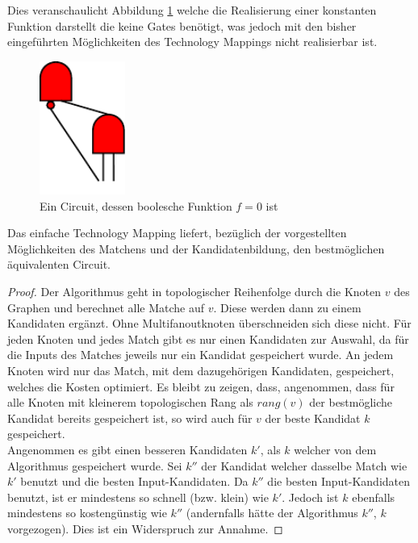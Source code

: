 \documentclass[11pt, a4paper, german]{article}
\newcommand{\TM}{Technology  Mapping }
\begin{document}
Dies veranschaulicht Abbildung \ref{bild:compl_redundant} welche die Realisierung einer konstanten Funktion darstellt die keine Gates benötigt, was jedoch mit den bisher eingeführten  Möglichkeiten des Technology Mappings nicht realisierbar ist.
\begin{figure}
		\includegraphics[width = 2.8cm]{pictures/compiled/compl_redundant}
		\caption{Ein Circuit, dessen boolesche Funktion $f = 0 $ ist}
		\label{bild:compl_redundant}
\end{figure}
\begin{cor}
	Das einfache \TM  liefert, bezüglich der vorgestellten Möglichkeiten des Matchens und der Kandidatenbildung, den bestmöglichen äquivalenten Circuit.
\end{cor}
\begin{proof} 
	Der Algorithmus geht in topologischer Reihenfolge durch die Knoten $v$ des Graphen und berechnet alle Matche auf $v$. Diese werden dann zu einem Kandidaten ergänzt. 
 Ohne Multifanoutknoten überschneiden sich diese nicht. Für jeden Knoten und jedes Match gibt es nur einen Kandidaten zur Auswahl, da für die Inputs des Matches jeweils nur ein Kandidat gespeichert wurde. An jedem Knoten wird nur das Match, mit dem dazugehörigen Kandidaten, gespeichert, welches die Kosten optimiert. 
 Es bleibt zu zeigen, dass, angenommen, dass für alle Knoten mit kleinerem topologischen Rang als $rang(v)$ der bestmögliche Kandidat bereits gespeichert ist, so wird auch für $v$ der beste Kandidat $k$ gespeichert. \\
 Angenommen es gibt einen besseren Kandidaten $k'$, als $k$ welcher von dem Algorithmus gespeichert wurde. Sei $k''$ der Kandidat welcher dasselbe Match wie $k'$ benutzt und die besten Input-Kandidaten. Da $k''$ die besten Input-Kandidaten benutzt, ist er mindestens so schnell (bzw. klein) wie $k'$. Jedoch ist $k$ ebenfalls mindestens so kostengünstig wie $k''$ (andernfalls hätte der Algorithmus $k''$, $k$ vorgezogen). Dies ist ein Widerspruch zur Annahme. 
\end{proof}
 
\end{document}
